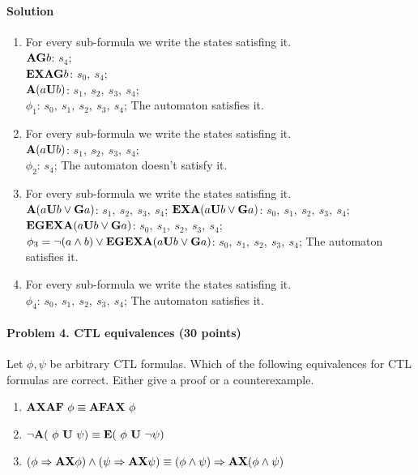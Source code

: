 \documentclass[11pt]{article}
\begin{document}
\paragraph{Solution}
\begin{enumerate}
\item For every sub-formula we write the states satisfing it.\\
${\bf AG} b$: $s_4$;\\
${\bf EXAG} b$: $s_0,~s_4$;\\
${\bf A} (a {\bf U} b)$: $s_1,~s_2,~s_3,~s_4$;\\
$\phi_1$: $s_0,~s_1,~s_2,~s_3,~s_4$; The automaton satisfies it.

\item For every sub-formula we write the states satisfing it.\\
${\bf A} (a {\bf U} b)$: $s_1,~s_2,~s_3,~s_4$;\\
$\phi_2$: $s_4$; The automaton doesn't satisfy it.

\item For every sub-formula we write the states satisfing it.\\
${\bf A} (a {\bf U} b \vee {\bf G} a)$: $s_1,~s_2,~s_3,~s_4$;
${\bf EXA} (a {\bf U} b \vee {\bf G} a)$: $s_0,~s_1,~s_2,~s_3,~s_4$;\\
${\bf EGEXA} (a {\bf U} b \vee {\bf G} a)$: $s_0,~s_1,~s_2,~s_3,~s_4$;\\
$\phi_3 = \lnot(a \wedge b) \vee {\bf EGEXA} (a {\bf U} b \vee {\bf G} a)$: $s_0,~s_1,~s_2,~s_3,~s_4$; The automaton satisfies it.

\item For every sub-formula we write the states satisfing it.\\
$\phi_4$: $s_0,~s_1,~s_2,~s_3,~s_4$; The automaton satisfies it.
\end{enumerate}

\paragraph{Problem 4. CTL equivalences (30 points)}
	\label{ex:CTL:mc}
Let $\phi, \psi$ be arbitrary CTL formulas. Which of the following equivalences for CTL formulas are correct. Either give a proof or a counterexample.
\begin{enumerate}
\item ${\bf A X A F}\ \phi \equiv {\bf A F A X}\ \phi$
\item $\neg {\bf A} (\ \phi\ {\bf U}\ \psi) \equiv {\bf E}(\ \phi \ {\bf U}\ \neg \psi)$
\item $(\phi \Rightarrow {\bf AX} \phi) \wedge (\psi \Rightarrow {\bf AX} \psi) \equiv 	(\phi \wedge \psi )\Rightarrow {\bf AX} (\phi \wedge \psi)$
\end{enumerate}
\end{document}
